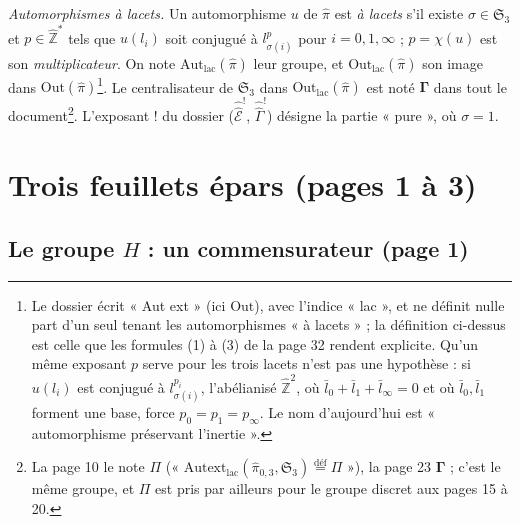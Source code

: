 \documentclass[11pt,a4paper]{article}
\begin{document}
\emph{Automorphismes à lacets.} Un automorphisme $u$ de $\widehat{\pi}$ est
\emph{à lacets} s'il existe $\sigma \in \mathfrak{S}_3$ et $p \in
\widehat{\mathbb{Z}}^{*}$ tels que $u(l_i)$ soit conjugué à $l_{\sigma(i)}^{p}$
pour $i = 0, 1, \infty$ ; $p = \chi(u)$ est son \emph{multiplicateur}. On note
$\mathrm{Aut}_{\mathrm{lac}}(\widehat{\pi})$ leur groupe, et
$\mathrm{Out}_{\mathrm{lac}}(\widehat{\pi})$ son image dans
$\mathrm{Out}(\widehat{\pi})$\footnote{Le dossier écrit « Aut ext » (ici
$\mathrm{Out}$), avec l'indice « lac », et ne définit nulle part d'un seul
tenant les automorphismes « à lacets » ; la définition ci-dessus est celle que
les formules (1) à (3) de la page 32 rendent explicite. Qu'un même exposant $p$
serve pour les trois lacets n'est pas une hypothèse : si $u(l_i)$ est conjugué
à $l_{\sigma(i)}^{p_i}$, l'abélianisé $\widehat{\mathbb{Z}}^2$, où $\bar l_0 +
\bar l_1 + \bar l_\infty = 0$ et où $\bar l_0, \bar l_1$ forment une base,
force $p_0 = p_1 = p_\infty$. Le nom d'aujourd'hui est « automorphisme
préservant l'inertie ».}. Le centralisateur de $\mathfrak{S}_3$ dans
$\mathrm{Out}_{\mathrm{lac}}(\widehat{\pi})$ est noté $\boldsymbol{\Gamma}$ dans
tout le document\footnote{La page 10 le note $\Pi$ (« $\mathrm{Autext}_{\mathrm{lac}}
(\hat\pi_{0,3}, \mathfrak{S}_3) \overset{\text{déf}}{=} \Pi$ »), la page 23
$\boldsymbol{\Gamma}$ ; c'est le même groupe, et $\Pi$ est pris par ailleurs pour
le groupe discret aux pages 15 à 20.}. L'exposant $!$ du dossier
($\hat{\hat{\mathcal{E}}}^{!}$, $\hat{\hat\Gamma}^{!}$) désigne la partie
« pure », où $\sigma = 1$.

\section*{Trois feuillets épars (pages 1 à 3)}

\subsection*{Le groupe $H$ : un commensurateur (page 1)}
\end{document}
